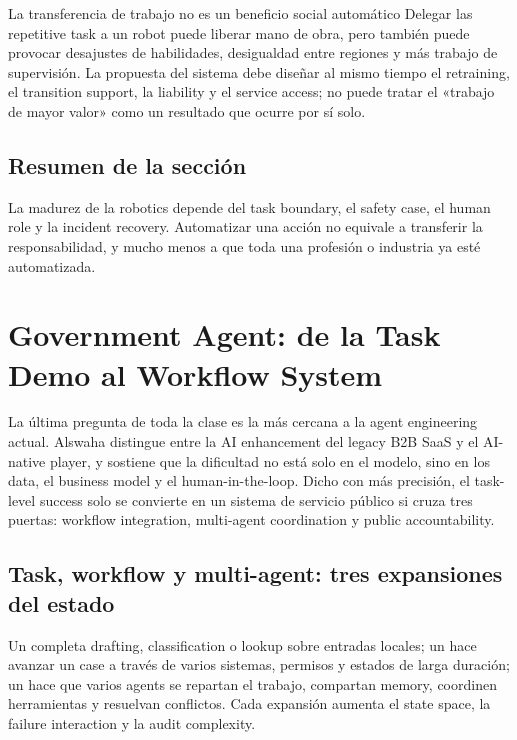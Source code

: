 \documentclass[a4paper]{article}
\begin{document}
\begin{warningbox}{La transferencia de trabajo no es un beneficio social automático}
Delegar las repetitive task a un robot puede liberar mano de obra, pero también puede provocar desajustes de habilidades, desigualdad entre regiones y más trabajo de supervisión. La propuesta del sistema debe diseñar al mismo tiempo el retraining, el transition support, la liability y el service access; no puede tratar el «trabajo de mayor valor» como un resultado que ocurre por sí solo.
\end{warningbox}

\subsection{Resumen de la sección}

La madurez de la robotics depende del task boundary, el safety case, el human role y la incident recovery. Automatizar una acción no equivale a transferir la responsabilidad, y mucho menos a que toda una profesión o industria ya esté automatizada.
\section{Government Agent: de la Task Demo al Workflow System}

La última pregunta de toda la clase es la más cercana a la agent engineering actual. Alswaha distingue entre la AI enhancement del legacy B2B SaaS y el AI-native player, y sostiene que la dificultad no está solo en el modelo, sino en los data, el business model y el human-in-the-loop. Dicho con más precisión, el task-level success solo se convierte en un sistema de servicio público si cruza tres puertas: workflow integration, multi-agent coordination y public accountability.

\subsection{Task, workflow y multi-agent: tres expansiones del estado}

Un  completa drafting, classification o lookup sobre entradas locales; un  hace avanzar un case a través de varios sistemas, permisos y estados de larga duración; un  hace que varios agents se repartan el trabajo, compartan memory, coordinen herramientas y resuelvan conflictos. Cada expansión aumenta el state space, la failure interaction y la audit complexity.
\end{document}
